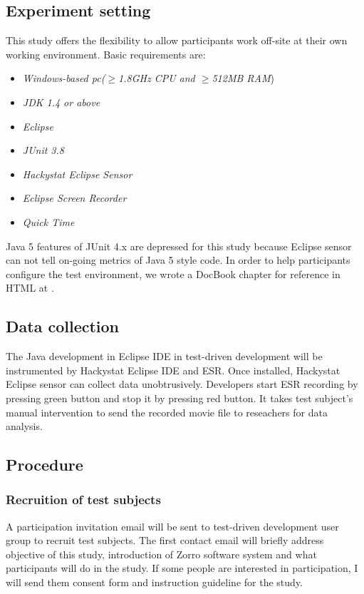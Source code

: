 \subsection{Experiment setting}
This study offers the flexibility to allow participants work off-site at
their own working environment. Basic requirements are:
\begin{itemize}
\item \textit{Windows-based pc(\begin{math}\ge\end{math}1.8GHz CPU and
    \begin{math}\ge\end{math}512MB RAM})
\item \textit{JDK 1.4 or above}
\item \textit{Eclipse}
\item \textit{JUnit 3.8}
\item \textit{Hackystat Eclipse Sensor}
\item \textit{Eclipse Screen Recorder}
\item \textit{Quick Time}
\end{itemize}
Java 5 features of JUnit 4.x are depressed for this study because Eclipse
sensor can not tell on-going metrics of Java 5 style code. In order to help
participants configure the test environment, we wrote a DocBook chapter for
reference in HTML at \cite{ZorroUserGuide}.

\subsection{Data collection}
The Java development in Eclipse IDE in test-driven development will be
instrumented by Hackystat Eclipse IDE and ESR. Once installed, Hackystat
Eclipse sensor can collect data unobtrusively. Developers start ESR
recording by pressing green button and stop it by pressing red button.
It takes test subject's manual intervention to send the recorded movie file
to reseachers for data analysis.

\subsection{Procedure}
\subsubsection{Recruition of test subjects}
A participation invitation email will be sent to test-driven development
user group to recruit test subjects. The first contact email will briefly
address objective of this study, introduction of Zorro software system and
what participants will do in the study. If some people are interested in
participation, I will send them consent form and instruction guideline for
the study.

